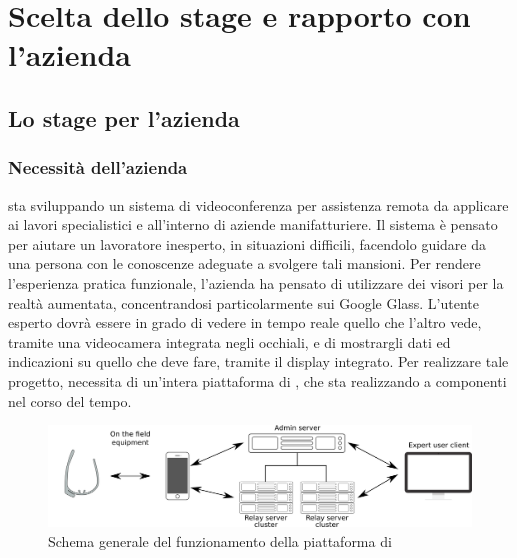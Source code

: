 \chapter{Scelta dello stage e rapporto con l'azienda}

\section{Lo stage per l'azienda}

   \subsection{Necessità dell'azienda}
   \nomeAzienda{} sta sviluppando un sistema di videoconferenza per assistenza remota da applicare ai lavori specialistici e all'interno di aziende manifatturiere. Il sistema è pensato per aiutare un lavoratore inesperto, in situazioni difficili, facendolo guidare da una persona con le conoscenze adeguate a svolgere tali mansioni. Per rendere l'esperienza pratica funzionale, l'azienda ha pensato di utilizzare dei visori per la realtà aumentata, concentrandosi particolarmente sui Google Glass. L'utente esperto dovrà essere in grado di vedere in tempo reale quello che l'altro vede, tramite una videocamera integrata negli occhiali, e di mostrargli dati ed indicazioni su quello che deve fare, tramite il display integrato. Per realizzare tale progetto, \nomeAzienda{} necessita di un'intera piattaforma di , che sta realizzando a componenti nel corso del tempo.
   \begin{figure}[H]
      \begin{center}
         \includegraphics[width=16.5cm,keepaspectratio]{immagini/erastreaming-schema}
      \end{center}
      \caption{Schema generale del funzionamento della piattaforma di }
   \end{figure}
